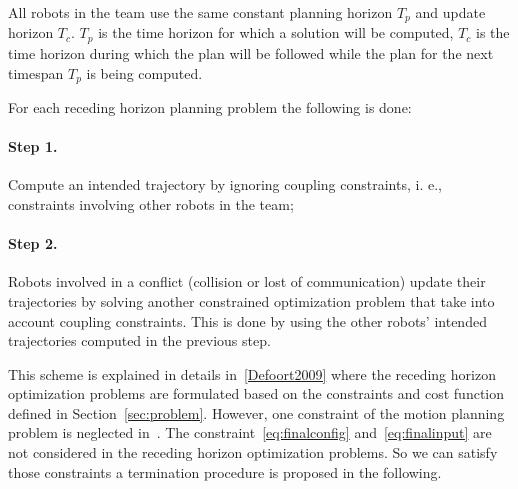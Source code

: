 \documentclass[eprint]{actapoly}
\begin{document}
All robots in the team use the same constant planning horizon $T_p$ and update
horizon $T_c$. $T_p$ is the time horizon for which a solution will be computed,
$T_c$ is the time horizon during which the plan will be followed while the plan for the next timespan $T_p$ is being computed.

For each receding horizon planning problem the following is done:
\paragraph{Step 1.} Compute an intended trajectory by ignoring coupling constraints, i. e., constraints involving other robots in the team;
\paragraph{Step 2.} Robots involved in a conflict (collision or lost of communication) update their trajectories
by solving another constrained optimization problem that take into account coupling constraints. This is done by
using the other robots' intended trajectories computed in the previous step.

%
%
%
%

\mbox{}

This scheme is explained in details in~\ref{Defoort2009} where the receding horizon optimization problems are formulated based on the constraints and cost function defined in Section~\ref{sec:problem}.
However, one constraint of the motion planning problem is
neglected in~\cite{Defoort2009}. The constraint~\ref{eq:finalconfig} and~\ref{eq:finalinput} are not considered
in the receding horizon optimization problems. So we can satisfy those constraints a termination procedure is proposed in the following.
\end{document}
